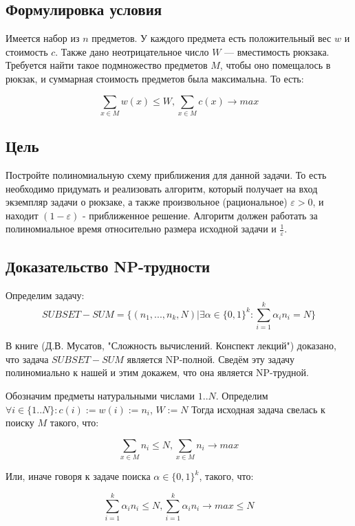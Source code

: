 \documentclass{article}
\begin{document}
	\subsection{Формулировка условия}

Имеется набор из $n$ предметов. У каждого предмета есть положительный вес $w$ и стоимость $c$. Также дано неотрицательное число $W$ — вместимость рюкзака.
Требуется найти такое подмножество предметов $M$, чтобы оно помещалось в рюкзак, и суммарная стоимость предметов была максимальна. То есть:

$$\sum\limits_{x \in M} {w(x)} \leq W, \sum\limits_{x \in M} {c(x)} \rightarrow max$$ 

	\subsection{Цель}

Постройте полиномиальную схему приближения для данной задачи. То есть необходимо придумать и реализовать алгоритм, который получает на вход экземпляр задачи о рюкзаке, а также произвольное (рациональное) $\varepsilon > 0$, и находит $(1 - \varepsilon)$ - приближенное решение. Алгоритм должен работать за полиномиальное время относительно размера исходной задачи и $\frac{1}{\varepsilon}$.

	\subsection{Доказательство NP-трудности}
 
Определим задачу: $$SUBSET-SUM = \{(n_1 , . . . , n_k , N ) | \exists \alpha \in \{0, 1\}^k : \sum\limits_{i = 1}^{k} {\alpha_i n_i} = N \}$$  

В книге (Д.В. Мусатов, "Сложность вычислений. Конспект лекций") доказано, что задача $SUBSET-SUM$ является NP-полной. Сведём эту задачу полиномиально к нашей и этим докажем, что она является NP-трудной. 
 
Обозначим предметы натуральными числами $1 .. N$. Определим $\forall i \in \{1..N\} : c(i) := w(i) := n_i$, $W := N$ Тогда исходная задача свелась к поиску $M$ такого, что:

$$\sum\limits_{x \in M} {n_i} \leq N, \sum\limits_{x \in M} {n_i} \rightarrow max$$ 
 
Или, иначе говоря к задаче поиска $\alpha \in \{0, 1\}^k$, такого, что:

$$\sum\limits_{i = 1}^{k} {\alpha_i n_i} \leq N, \sum\limits_{i = 1}^{k} {\alpha_i n_i} \rightarrow max \leq N$$ 
\end{document}
